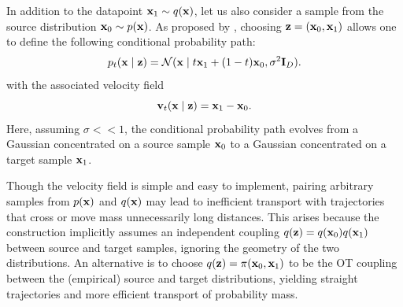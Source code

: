 In addition to the datapoint ${ \mathbf{x}}_1\sim q({ \mathbf{x}})$, let us also consider a sample from the source distribution ${ \mathbf{x}}_0\sim p({ \mathbf{x}})$. As proposed by \cite{liu2022rectified}, choosing  ${ \mathbf{z}}=({ \mathbf{x}}_0,{ \mathbf{x}}_1)$ allows one to define the following conditional probability path: 
\begin{equation}
    p_t( { \mathbf{x}} \mid { \mathbf{z}}) = {\mathcal N}({ \mathbf{x}} \mid t{ \mathbf{x}}_1 + (1-t){ \mathbf{x}}_0,\sigma^2{\mathbf I}_D). 
\end{equation}
with the associated velocity field
\begin{equation}
    { \mathbf{v}}_t( { \mathbf{x}} \mid { \mathbf{z}}) = { \mathbf{x}}_1 - { \mathbf{x}}_0.
\end{equation}
Here, assuming $\sigma<<1$, the conditional probability path evolves from a Gaussian concentrated on a source sample ${ \mathbf{x}}_0$ to a Gaussian concentrated on a target sample ${ \mathbf{x}}_1$. 

\begin{remark}
    Though the velocity field is simple and easy to implement, pairing arbitrary
    samples from $p({ \mathbf{x}})$ and $q({ \mathbf{x}})$ may lead to inefficient transport with
    trajectories that cross or move mass unnecessarily long distances. This
    arises because the construction implicitly assumes an independent coupling
    $q({ \mathbf{z}})=q({ \mathbf{x}}_0)q({ \mathbf{x}}_1)$ between source and target samples, ignoring the
    geometry of the two distributions. An alternative is to choose
    $q({ \mathbf{z}})=\pi({ \mathbf{x}}_0,{ \mathbf{x}}_1)$ to be the OT coupling between the
    (empirical) source and target distributions, yielding straight trajectories
    and more efficient transport of probability mass.
\end{remark}

